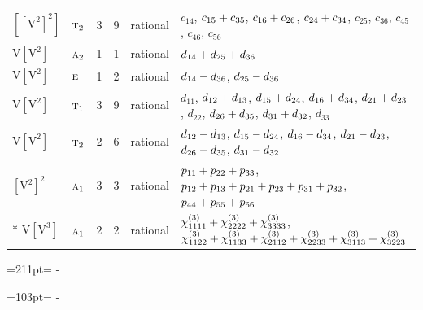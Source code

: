 \documentclass[10pt,a4paper]{article}
\newcommand{\needspace}[1]{\par\penalty-100\begingroup\dimen0=#1\relax\dimen2=\pagegoal
  \advance\dimen2-\pagetotal\ifdim\dimen0>\dimen2\relax\ifdim\dimen2>0pt\vfil\break\fi\fi
  \endgroup}
\numberwithin{equation}{section}
\newcommand{\irr}[1]{\text{\normalfont\scshape #1}}
\newcommand{\jahn}[1]{\mathrm{#1}}
\newlength{\fillwidth}\newlength{\cellwidth}\newlength{\colwidth}
\newcommand{\signbreak}{\penalty100\relax}
\begin{document}
{\begin{longtable}{@{}llrrl>{\RaggedRight\arraybackslash}p{\fillwidth}@{}}
$\jahn{[[V^{2}]^{2}]}$ & $\irr{t}_{2}$ & 3 & 9 & rational & $c_{14}$, $c_{15} +\signbreak c_{35}$, $c_{16} +\signbreak c_{26}$, $c_{24} +\signbreak c_{34}$, $c_{25}$, $c_{36}$, $c_{45}$, $c_{46}$, $c_{56}$\\
$\jahn{V[V^{2}]}$ & $\irr{a}_{2}$ & 1 & 1 & rational & $d_{14} +\signbreak d_{25} +\signbreak d_{36}$\\
$\jahn{V[V^{2}]}$ & $\irr{e}$ & 1 & 2 & rational & $d_{14} -\signbreak d_{36}$, $d_{25} -\signbreak d_{36}$\\
$\jahn{V[V^{2}]}$ & $\irr{t}_{1}$ & 3 & 9 & rational & $d_{11}$, $d_{12} +\signbreak d_{13}$, $d_{15} +\signbreak d_{24}$, $d_{16} +\signbreak d_{34}$, $d_{21} +\signbreak d_{23}$, $d_{22}$, $d_{26} +\signbreak d_{35}$, $d_{31} +\signbreak d_{32}$, $d_{33}$\\
$\jahn{V[V^{2}]}$ & $\irr{t}_{2}$ & 2 & 6 & rational & $d_{12} -\signbreak d_{13}$, $d_{15} -\signbreak d_{24}$, $d_{16} -\signbreak d_{34}$, $d_{21} -\signbreak d_{23}$, $d_{26} -\signbreak d_{35}$, $d_{31} -\signbreak d_{32}$\\
$\jahn{[V^{2}]^{2}}$ & $\irr{a}_{1}$ & 3 & 3 & rational & $p_{11} +\signbreak p_{22} +\signbreak p_{33}$, $p_{12} +\signbreak p_{13} +\signbreak p_{21} +\signbreak p_{23} +\signbreak p_{31} +\signbreak p_{32}$, $p_{44} +\signbreak p_{55} +\signbreak p_{66}$\\*
$\jahn{V[V^{3}]}$ & $\irr{a}_{1}$ & 2 & 2 & rational & $\chi^{(3)}_{1111} +\signbreak \chi^{(3)}_{2222} +\signbreak \chi^{(3)}_{3333}$, $\chi^{(3)}_{1122} +\signbreak \chi^{(3)}_{1133} +\signbreak \chi^{(3)}_{2112} +\signbreak \chi^{(3)}_{2233} +\signbreak \chi^{(3)}_{3113} +\signbreak \chi^{(3)}_{3223}$\\
\bottomrule\end{longtable}}
\needspace{211pt}
\needspace{103pt}
\end{document}
